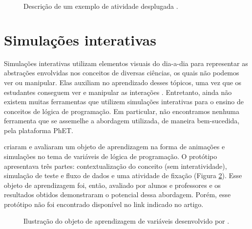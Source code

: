 \begin{figure}[h!]
    \centering
    \setlength{\fboxrule}{0.1pt} %
    \caption{Descrição de um exemplo de atividade desplugada \citep{brackmann2017desenvolvimento}.}
    \label{figure:desplugada}
\end{figure}

\section{Simulações interativas}

Simulações interativas utilizam elementos visuais do dia-a-dia para representar as abstrações envolvidas nos conceitos de diversas ciências, os quais não podemos ver ou manipular. Elas auxiliam no aprendizado desses tópicos, uma vez que os estudantes conseguem ver e manipular as interações \citep{price2018and}. Entretanto, ainda não existem muitas ferramentas que utilizem simulações interativas para o ensino de conceitos de lógica de programação. Em particular, não encontramos nenhuma ferramenta que se assemelhe a abordagem utilizada, de maneira bem-sucedida, pela plataforma PhET.

\citet{fernandes2012animacoes} criaram e avaliaram um objeto de aprendizagem na forma de animações e simulações no tema de variáveis de lógica de programação. O protótipo apresentava três partes: contextualização do conceito (sem interatividade), simulação de teste e fluxo de dados e uma atividade de fixação (Figura \ref{figure:oa}). Esse objeto de aprendizagem foi, então, avaliado por alunos e professores e os resultados obtidos demonstraram o potencial dessa abordagem. Porém, esse protótipo não foi encontrado disponível no link indicado no artigo.

\begin{figure}[h!]
    \centering
    \setlength{\fboxrule}{0.1pt} %
    \caption{Ilustração do objeto de aprendizagem de variáveis desenvolvido por \citet{fernandes2012animacoes}.}
    \label{figure:oa}
\end{figure}

